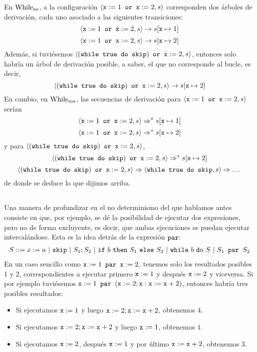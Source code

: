 En $\mathrm{While}_{\mathrm{ns}}$, a la configuración $\langle \texttt{x}:= 1 \texttt{ or } \texttt{x}:=2, s \rangle$ corresponden dos árboles de derivación, cada uno asociado a las siguientes transiciones:
$$\langle \texttt{x}:= 1 \texttt{ or } \texttt{x}:=2, s \rangle \to s[\texttt{x}\mapsto 1]$$
$$\langle \texttt{x}:= 1 \texttt{ or } \texttt{x}:=2, s \rangle \to s[\texttt{x}\mapsto 2]$$
Además, si tuviésemos $\langle (\texttt{while true do skip}) \texttt{ or } \texttt{x}:=2, s \rangle$, entonces solo habría un árbol de derivación posible, a saber, el que no corresponde al bucle, es decir, 
$$\langle (\texttt{while true do skip}) \texttt{ or } \texttt{x}:=2, s \rangle \to s[\texttt{x}\mapsto 2]$$
En cambio, en $\mathrm{While}_{\mathrm{sos}}$, las secuencias de derivación para $\langle \texttt{x}:= 1 \texttt{ or } \texttt{x}:=2, s \rangle$ serían
$$\langle \texttt{x}:= 1 \texttt{ or } \texttt{x}:=2, s \rangle \Rightarrow^* s[\texttt{x}\mapsto 1]$$
$$\langle \texttt{x}:= 1 \texttt{ or } \texttt{x}:=2, s \rangle \Rightarrow^* s[\texttt{x}\mapsto 2]$$
y para $\langle (\texttt{while true do skip}) \texttt{ or } \texttt{x}:=2, s \rangle$, 
$$\langle (\texttt{while true do skip}) \texttt{ or } \texttt{x}:=2, s \rangle \Rightarrow^* s[\texttt{x}\mapsto 2]$$
$$\langle (\texttt{while true do skip}) \texttt{ or } \texttt{x}:=2, s \rangle \Rightarrow \langle \texttt{while true do skip}, s \rangle \Rightarrow\dots$$
de donde se deduce lo que dijimos arriba.


\subsection{}

Una manera de profundizar en el no determinismo del que hablamos antes consiste en que, por ejemplo, se dé la posibilidad de ejecutar dos expresiones, pero no de forma excluyente, es decir, que ambas ejecuciones se puedan ejecutar intercalándose. Esta es la idea detrás de la expresión $\texttt{par}$:
\[
    \begin{array}{l}
         S ::= x:=a\ |\ \n{skip}\ |\ S_1;S_2\ |\ \n{if}\ b\ \n{then}\ S_1\ \n{else}\ S_2\ |\ \n{while}\ b\ \n{do}\ S \ | \ S_1 \n{ par } S_2
    \end{array}
\]
En un caso sencillo como $\texttt{x}:= 1 \texttt{ par } \texttt{x}:=2$, tenemos solo los resultados posibles 1 y 2, correspondientes a ejecutar primero $\texttt{x}:= 1$ y después $\texttt{x}:=2$ y viceversa. Si por ejemplo tuviésemos $\texttt{x}:= 1 \texttt{ par } (\texttt{x}:=2; \texttt{x}:\texttt{x}:=\texttt{x} + 2)$, entonces habría tres posibles resultados:
\begin{itemize}
    \item Si ejecutamos $\texttt{x}:=1$ y luego $\texttt{x}:=2; \texttt{x}:= \texttt{x}+2$, obtenemos $4$.
    \item Si ejecutamos $\texttt{x}:=2; \texttt{x}:= \texttt{x}+2$ y luego $\texttt{x}:=1$, obtenemos $1$.
    \item Si ejecutamos $\texttt{x}:=2$, después $\texttt{x}:=1$ y por último $\texttt{x}:= \texttt{x}+2$, obtenemos 3.
\end{itemize}


